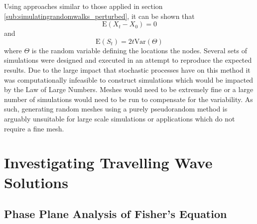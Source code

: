\documentclass[11pt,titlepage,a4paper]{article}
\begin{document}
			Using approaches similar to those applied in section \ref{sub:simulatingrandomwalks_perturbed}, it can be shown that
			\begin{equation*}
				\mathrm{E} \left(X_t - X_0 \right) = 0
			\end{equation*}
			and 
			\begin{equation*}
				\mathrm{E} \left(S_t \right) = 2 t \mathrm{Var} \left(\Theta \right)
			\end{equation*}
			where $\Theta$ is the random variable defining the locations the nodes. Several sets of simulations were designed and executed in an attempt to reproduce the expected results. Due to the large impact that stochastic processes have on this method it was computationally infeasible to construct simulations which would be impacted by the Law of Large Numbers. Meshes would need to be extremely fine or a large number of simulations would need to be run to compensate for the variability. As such, generating random meshes using a purely pseudorandom method is arguably unsuitable for large scale simulations or applications which do not require a fine mesh. 
		
	


\section{Investigating Travelling Wave Solutions}
	\label{sec:investigatingfishersequation}
	
	\subsection{Phase Plane Analysis of Fisher's Equation}
		\label{sub:phaseplaneanalysisoffishersequation}
		
\end{document}
